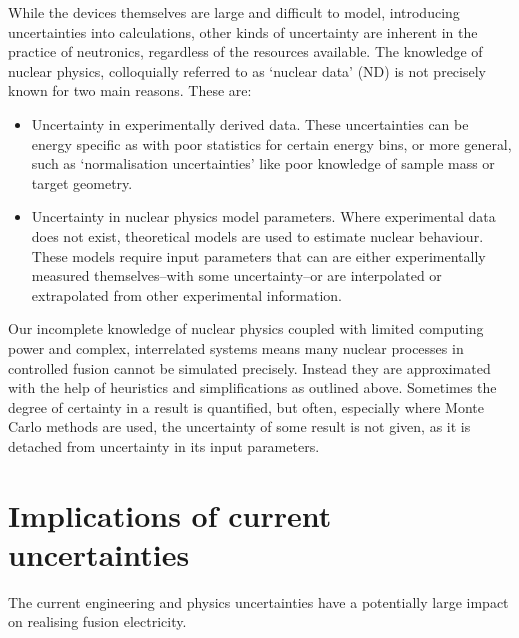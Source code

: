 While the devices themselves are large and difficult to model, introducing uncertainties into calculations, other kinds of uncertainty are inherent in the practice of neutronics, regardless of the resources available. The knowledge of nuclear physics, colloquially referred to as `nuclear data' (ND)  is not precisely known for two main reasons. These are:  

\begin{itemize}
  \item Uncertainty in experimentally derived data. These uncertainties can be energy specific as with poor statistics for certain energy bins, or more general, such as `normalisation uncertainties' like poor knowledge of sample mass or target geometry.
  \item Uncertainty in nuclear physics model parameters. Where experimental data does not exist, theoretical models are used to estimate nuclear behaviour. These models require input parameters that can are either experimentally measured themselves--with some uncertainty--or are interpolated or extrapolated from other experimental information. 
\end{itemize}

Our incomplete knowledge of nuclear physics coupled with limited computing power and complex, interrelated systems means many nuclear processes in controlled fusion cannot be simulated precisely. Instead they are approximated with the help of heuristics and simplifications as outlined above. Sometimes the degree of certainty in a result is quantified, but often, especially where Monte Carlo methods are used, the uncertainty of some result is not given, as it is detached from uncertainty in its input parameters.

\section{Implications of current uncertainties}
The current engineering and physics uncertainties have a potentially large impact on realising fusion electricity. 

